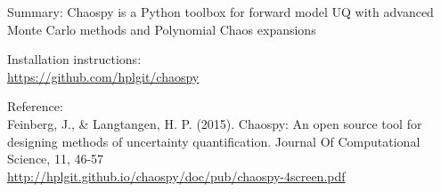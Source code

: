 \documentclass[handout]{beamer}
\begin{document}
  \begin{frame}{Summary: Chaospy is a Python toolbox for forward model UQ with advanced Monte Carlo methods and Polynomial Chaos expansions}
  \begin{alert}{Installation instructions:}\\
  \scriptsize
      \href{https://github.com/hplgit/chaospy}{https://github.com/hplgit/chaospy}\\
  \end{alert}


\vspace{7mm}

  \begin{alert}{Reference:}\\
  \scriptsize
      Feinberg, J., \& Langtangen, H. P. (2015). Chaospy: An open source tool for designing methods of uncertainty quantification. Journal Of Computational Science, 11, 46-57\\

      \vspace{3mm}
      \href{http://hplgit.github.io/chaospy/doc/pub/chaospy-4screen.pdf}{http://hplgit.github.io/chaospy/doc/pub/chaospy-4screen.pdf}
  \end{alert}



\pause
{}



\end{frame}
\end{document}
